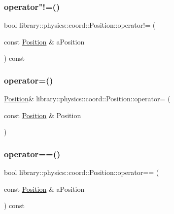 \subsubsection{\texorpdfstring{operator"!=()}{operator!=()}}
{\footnotesize\ttfamily bool library\+::physics\+::coord\+::\+Position\+::operator!= (\begin{DoxyParamCaption}\item[{const \hyperlink{classlibrary_1_1physics_1_1coord_1_1_position}{Position} \&}]{a\+Position }\end{DoxyParamCaption}) const}

\mbox{\label{classlibrary_1_1physics_1_1coord_1_1_position_a5efd032c43ad551922c7ffcd71961090}} 
\subsubsection{\texorpdfstring{operator=()}{operator=()}}
{\footnotesize\ttfamily \hyperlink{classlibrary_1_1physics_1_1coord_1_1_position}{Position}\& library\+::physics\+::coord\+::\+Position\+::operator= (\begin{DoxyParamCaption}\item[{const \hyperlink{classlibrary_1_1physics_1_1coord_1_1_position}{Position} \&}]{Position }\end{DoxyParamCaption})\hspace{0.3cm}{\ttfamily [delete]}}

\mbox{\label{classlibrary_1_1physics_1_1coord_1_1_position_a520bfdf64e8f45f60e815ebc72012fde}} 
\subsubsection{\texorpdfstring{operator==()}{operator==()}}
{\footnotesize\ttfamily bool library\+::physics\+::coord\+::\+Position\+::operator== (\begin{DoxyParamCaption}\item[{const \hyperlink{classlibrary_1_1physics_1_1coord_1_1_position}{Position} \&}]{a\+Position }\end{DoxyParamCaption}) const}

